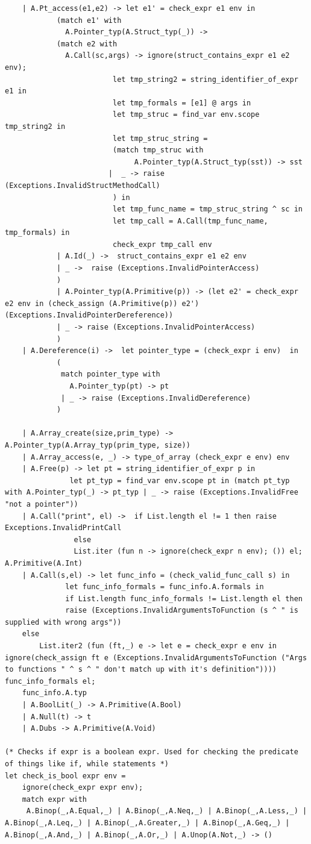 \documentclass{article}
\begin{document}
\begin{lstlisting}
	| A.Pt_access(e1,e2) -> let e1' = check_expr e1 env in
			(match e1' with
			  A.Pointer_typ(A.Struct_typ(_)) -> 
			(match e2 with 
			  A.Call(sc,args) -> ignore(struct_contains_expr e1 e2 env); 
					     let tmp_string2 = string_identifier_of_expr e1 in
					     let tmp_formals = [e1] @ args in
					     let tmp_struc = find_var env.scope tmp_string2 in
					     let tmp_struc_string = 
					     (match tmp_struc with
					          A.Pointer_typ(A.Struct_typ(sst)) -> sst
						|  _ -> raise (Exceptions.InvalidStructMethodCall) 
					     ) in
					     let tmp_func_name = tmp_struc_string ^ sc in
					     let tmp_call = A.Call(tmp_func_name, tmp_formals) in 	
					     check_expr tmp_call env
			| A.Id(_) ->  struct_contains_expr e1 e2 env
			| _ ->  raise (Exceptions.InvalidPointerAccess)
			)
			| A.Pointer_typ(A.Primitive(p)) -> (let e2' = check_expr e2 env in (check_assign (A.Primitive(p)) e2') (Exceptions.InvalidPointerDereference))
			| _ -> raise (Exceptions.InvalidPointerAccess)
			)
	| A.Dereference(i) ->  let pointer_type = (check_expr i env)  in 
			(
			 match pointer_type with 
			   A.Pointer_typ(pt) -> pt
			 | _ -> raise (Exceptions.InvalidDereference) 
			)
				
	| A.Array_create(size,prim_type) -> A.Pointer_typ(A.Array_typ(prim_type, size))
	| A.Array_access(e, _) -> type_of_array (check_expr e env) env
	| A.Free(p) -> let pt = string_identifier_of_expr p in 
		       let pt_typ = find_var env.scope pt in (match pt_typ with A.Pointer_typ(_) -> pt_typ | _ -> raise (Exceptions.InvalidFree "not a pointer"))
	| A.Call("print", el) ->  if List.length el != 1 then raise Exceptions.InvalidPrintCall 
				else
				List.iter (fun n -> ignore(check_expr n env); ()) el; A.Primitive(A.Int)
	| A.Call(s,el) -> let func_info = (check_valid_func_call s) in
			  let func_info_formals = func_info.A.formals in
			  if List.length func_info_formals != List.length el then
			  raise (Exceptions.InvalidArgumentsToFunction (s ^ " is supplied with wrong args"))
	else
		List.iter2 (fun (ft,_) e -> let e = check_expr e env in ignore(check_assign ft e (Exceptions.InvalidArgumentsToFunction ("Args to functions " ^ s ^ " don't match up with it's definition")))) func_info_formals el;
	func_info.A.typ
	| A.BoolLit(_) -> A.Primitive(A.Bool)
	| A.Null(t) -> t
	| A.Dubs -> A.Primitive(A.Void)

(* Checks if expr is a boolean expr. Used for checking the predicate of things like if, while statements *)
let check_is_bool expr env = 
	ignore(check_expr expr env);
	match expr with
	 A.Binop(_,A.Equal,_) | A.Binop(_,A.Neq,_) | A.Binop(_,A.Less,_) | A.Binop(_,A.Leq,_) | A.Binop(_,A.Greater,_) | A.Binop(_,A.Geq,_) | A.Binop(_,A.And,_) | A.Binop(_,A.Or,_) | A.Unop(A.Not,_) -> ()


\end{lstlisting}
\end{document}
